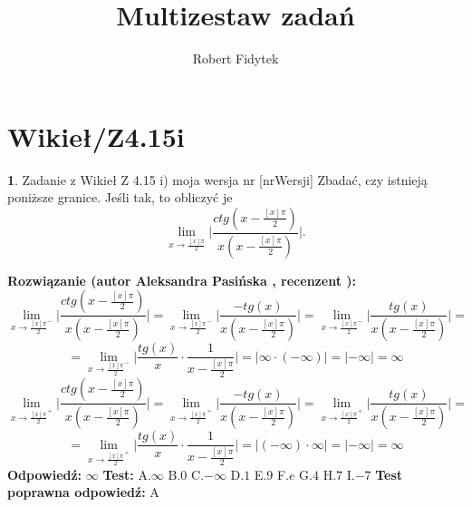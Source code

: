 \documentclass[12pt, a4paper]{article}
\title{Multizestaw zadań}
\author{Robert Fidytek}
\date{}
\theoremstyle{definition} %
\newtheorem{zad}{}
\newcommand{\kategoria}[1]{\section{#1}} %
\newcommand{\zadStart}[1]{\begin{zad}#1\newline} %
\newcommand{\zadStop}{\end{zad}}   %
\newcommand{\rozwStart}[2]{\noindent \textbf{Rozwiązanie (autor #1 , recenzent #2): }\newline} %
\newcommand{\rozwStop}{\newline}                                            %
\newcommand{\odpStart}{\noindent \textbf{Odpowiedź:}\newline}    %
\newcommand{\odpStop}{\newline}                                             %
\newcommand{\testStart}{\noindent \textbf{Test:}\newline} %
\newcommand{\testStop}{\newline} %
\newcommand{\kluczStart}{\noindent \textbf{Test poprawna odpowiedź:}\newline} %
\newcommand{\kluczStop}{\newline} %
\begin{document}
\maketitle


\kategoria{Wikieł/Z4.15i}
\zadStart{Zadanie z Wikieł Z 4.15 i) moja wersja nr [nrWersji]}
Zbadać, czy istnieją poniższe granice. Jeśli tak, to obliczyć je $$\lim_{x\rightarrow \frac{[x]\pi}{2}}\biggl|\frac{ctg(x-\frac{[x]\pi}{2})}{x(x-\frac{[x]\pi}{2})}\biggr|.$$
\zadStop
\rozwStart{Aleksandra Pasińska}{}
$$\lim_{x\rightarrow \frac{[x]\pi}{2}^-}\biggl|\frac{ctg(x-\frac{[x]\pi}{2})}{x(x-\frac{[x]\pi}{2})}\biggr|=\lim_{x\rightarrow \frac{[x]\pi}{2}^-}\biggl|\frac{-tg(x)}{x(x-\frac{[x]\pi}{2})}\biggr|=\lim_{x\rightarrow \frac{[x]\pi}{2}^-}\biggl|\frac{tg(x)}{x(x-\frac{[x]\pi}{2})}\biggr|=$$
$$=\lim_{x\rightarrow \frac{[x]\pi}{2}^-}\biggl|\frac{tg(x)}{x}\cdot\frac{1}{x-\frac{[x]\pi}{2}}\biggr|=|\infty\cdot(-\infty)|=|-\infty|=\infty$$
$$\lim_{x\rightarrow \frac{[x]\pi}{2}^+}\biggl|\frac{ctg(x-\frac{[x]\pi}{2})}{x(x-\frac{[x]\pi}{2})}\biggr|=\lim_{x\rightarrow \frac{[x]\pi}{2}^+}\biggl|\frac{-tg(x)}{x(x-\frac{[x]\pi}{2})}\biggr|=\lim_{x\rightarrow \frac{[x]\pi}{2}^+}\biggl|\frac{tg(x)}{x(x-\frac{[x]\pi}{2})}\biggr|=$$
$$=\lim_{x\rightarrow \frac{[x]\pi}{2}^+}\biggl|\frac{tg(x)}{x}\cdot\frac{1}{x-\frac{[x]\pi}{2}}\biggr|=|(-\infty)\cdot\infty|=|-\infty|=\infty$$
\rozwStop
\odpStart
$\infty$
\odpStop
\testStart
A.$\infty$
B.$0$
C.$-\infty$
D.$1$
E.$9$
F.$e$
G.$4$
H.$7$
I.$-7$
\testStop
\kluczStart
A
\kluczStop
\end{document}
